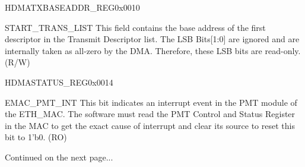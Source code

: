 \begin{register}{H}{DMATXBASEADDR\_REG}{0x0010}\label{regdesc:DMATXBASEADDRREG}
%
\regnewline%
\begin{regdesc}\begin{reglist}
\item [START\_TRANS\_LIST]This field contains the base address of the first descriptor in the Transmit Descriptor list. The LSB Bits[1:0] are ignored and are internally taken as all-zero by the DMA. Therefore, these LSB bits are read-only. (R/W)
\end{reglist}\end{regdesc}
\end{register}


\begin{register}{H}{DMASTATUS\_REG}{0x0014}
%
%
%
%
%
%
%
%
%
%
%
%
%
%
%
%
%
%
%
%
%
%
%
\regnewline%
\begin{regdesc}\begin{reglist}

\item [EMAC\_PMT\_INT]This bit indicates an interrupt event in the PMT module of the ETH\_MAC. The software must read the PMT Control and Status Register in the MAC to get the exact cause of interrupt and clear its source to reset this bit to 1'b0. (RO)
\item [Continued on the next page...]
\end{reglist}\end{regdesc}
\end{register}


